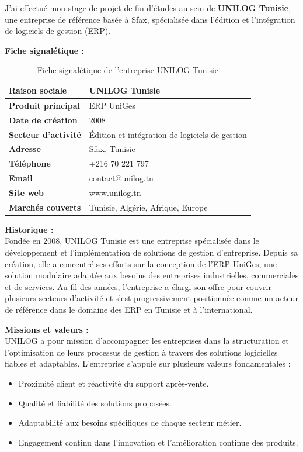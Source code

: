 ﻿\documentclass[12pt,a4paper,oneside]{report} %
\begin{document}
J'ai effectué mon stage de projet de fin d'études au sein de \textbf{UNILOG Tunisie}, une entreprise de référence basée à Sfax, spécialisée dans l'édition et l'intégration de logiciels de gestion (ERP). 

\textbf{Fiche signalétique :}

\begin{table}[H]
\centering
\begin{tabularx}{\textwidth}{|l|X|}
\hline
\textbf{Raison sociale} & UNILOG Tunisie \\ \hline
\textbf{Produit principal} & ERP UniGes \\ \hline
\textbf{Date de création} & 2008 \\ \hline
\textbf{Secteur d'activité} & Édition et intégration de logiciels de gestion \\ \hline
\textbf{Adresse} & Sfax, Tunisie \\ \hline
\textbf{Téléphone} & +216 70 221 797 \\ \hline
\textbf{Email} & contact@unilog.tn \\ \hline
\textbf{Site web} & www.unilog.tn \\ \hline
\textbf{Marchés couverts} & Tunisie, Algérie, Afrique, Europe \\ \hline
\end{tabularx}
\caption{Fiche signalétique de l'entreprise UNILOG Tunisie}
\end{table}

\textbf{Historique :}\\
Fondée en 2008, UNILOG Tunisie est une entreprise spécialisée dans le développement et l'implémentation de solutions de gestion d'entreprise. Depuis sa création, elle a concentré ses efforts sur la conception de l'ERP UniGes, une solution modulaire adaptée aux besoins des entreprises industrielles, commerciales et de services. Au fil des années, l'entreprise a élargi son offre pour couvrir plusieurs secteurs d'activité et s'est progressivement positionnée comme un acteur de référence dans le domaine des ERP en Tunisie et à l'international.

\textbf{Missions et valeurs :}\\
UNILOG a pour mission d'accompagner les entreprises dans la structuration et l'optimisation de leurs processus de gestion à travers des solutions logicielles fiables et adaptables. L'entreprise s'appuie sur plusieurs valeurs fondamentales :
\begin{itemize}
    \item Proximité client et réactivité du support après-vente.
    \item Qualité et fiabilité des solutions proposées.
    \item Adaptabilité aux besoins spécifiques de chaque secteur métier.
    \item Engagement continu dans l'innovation et l'amélioration continue des produits.
\end{itemize}
\end{document}
